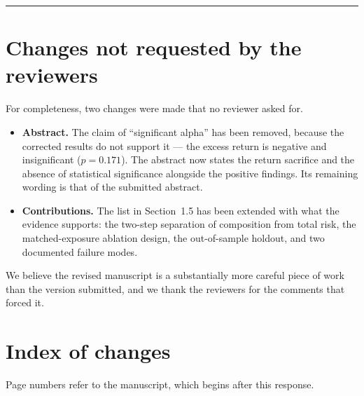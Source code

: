\documentclass[11pt,a4paper]{article}
\begin{document}
\bigskip
\noindent\rule{\linewidth}{1pt}
\section*{Changes not requested by the reviewers}

For completeness, two changes were made that no reviewer asked for.

\begin{itemize}
\item \textbf{Abstract.} The claim of ``significant alpha'' has been removed, because the
corrected results do not support it --- the excess return is negative and insignificant
($p = 0.171$). The abstract now states the return sacrifice and the absence of statistical
significance alongside the positive findings. Its remaining wording is that of the
submitted abstract.
\item \textbf{Contributions.} The list in Section~1.5 has been extended with what the
evidence supports: the two-step separation of composition from total risk, the
matched-exposure ablation design, the out-of-sample holdout, and two documented failure
modes.
\end{itemize}

We believe the revised manuscript is a substantially more careful piece of work than the
version submitted, and we thank the reviewers for the comments that forced it.

\clearpage
\section*{Index of changes}

\noindent Page numbers refer to the manuscript, which begins after this response.
\end{document}
